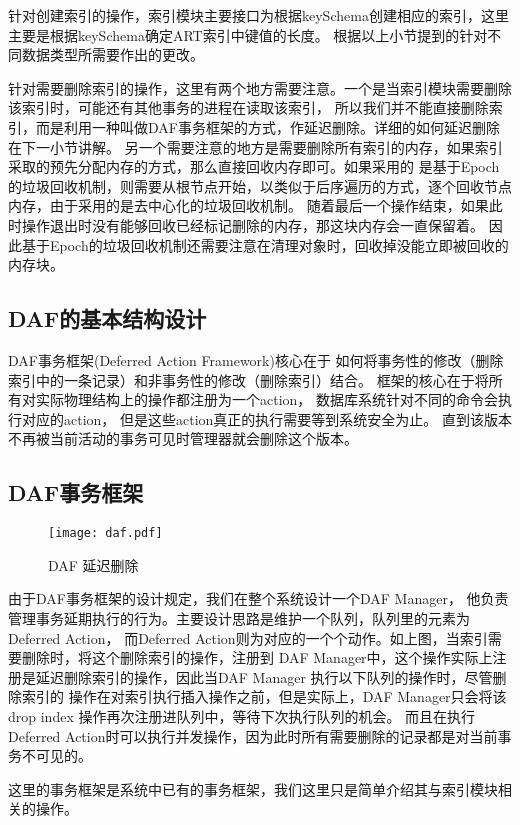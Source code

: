 针对创建索引的操作，索引模块主要接口为根据keySchema创建相应的索引，这里主要是根据keySchema确定ART索引中键值的长度。
根据以上小节提到的针对不同数据类型所需要作出的更改。

针对需要删除索引的操作，这里有两个地方需要注意。一个是当索引模块需要删除该索引时，可能还有其他事务的进程在读取该索引，
所以我们并不能直接删除索引，而是利用一种叫做DAF事务框架的方式，作延迟删除。详细的如何延迟删除在下一小节讲解。
另一个需要注意的地方是需要删除所有索引的内存，如果索引采取的预先分配内存的方式，那么直接回收内存即可。如果采用的
是基于Epoch的垃圾回收机制，则需要从根节点开始，以类似于后序遍历的方式，逐个回收节点内存，由于采用的是去中心化的垃圾回收机制。
随着最后一个操作结束，如果此时操作退出时没有能够回收已经标记删除的内存，那这块内存会一直保留着。
因此基于Epoch的垃圾回收机制还需要注意在清理对象时，回收掉没能立即被回收的内存块。

\subsection{DAF的基本结构设计}
DAF事务框架(Deferred Action Framework)核心在于
如何将事务性的修改（删除索引中的一条记录）和非事务性的修改（删除索引）结合。
框架的核心在于将所有对实际物理结构上的操作都注册为一个action，
数据库系统针对不同的命令会执行对应的action， 但是这些action真正的执行需要等到系统安全为止。
直到该版本不再被当前活动的事务可见时管理器就会删除这个版本。

\subsection{DAF事务框架}

\begin{figure}[h]
  \centering
  \texttt{[image: daf.pdf]}
  \caption{DAF 延迟删除}
  \label{fig:daf}
\end{figure}

由于DAF事务框架的设计规定，我们在整个系统设计一个DAF Manager，
他负责管理事务延期执行的行为。主要设计思路是维护一个队列，队列里的元素为Deferred Action，
而Deferred Action则为对应的一个个动作。如上图，当索引需要删除时，将这个删除索引的操作，注册到
DAF Manager中，这个操作实际上注册是延迟删除索引的操作，因此当DAF Manager 执行以下队列的操作时，尽管删除索引的
操作在对索引执行插入操作之前，但是实际上，DAF Manager只会将该drop index 操作再次注册进队列中，等待下次执行队列的机会。
而且在执行Deferred Action时可以执行并发操作，因为此时所有需要删除的记录都是对当前事务不可见的。

这里的事务框架是系统中已有的事务框架，我们这里只是简单介绍其与索引模块相关的操作。

